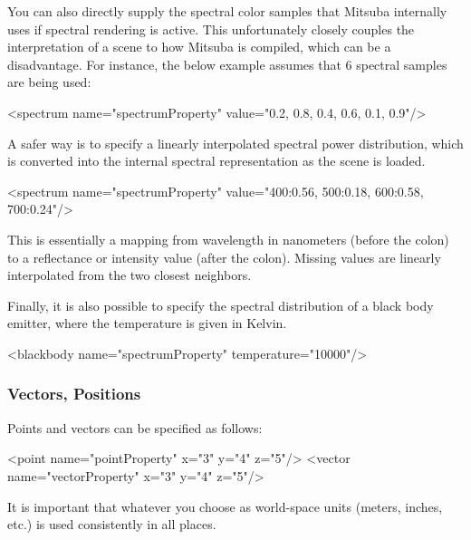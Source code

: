 You can also directly supply the spectral color samples that Mitsuba internally uses if spectral rendering is
active. This unfortunately closely couples the interpretation of a scene to how Mitsuba is compiled, which can be a disadvantage.
For instance, the below example assumes that 6 spectral samples are being used:
\begin{xml}
<spectrum name="spectrumProperty" value="0.2, 0.8, 0.4, 0.6, 0.1, 0.9"/>
\end{xml}
A safer way is to specify a linearly interpolated spectral power distribution, which is converted into
the internal spectral representation as the scene is loaded.
\begin{xml}
<spectrum name="spectrumProperty" value="400:0.56, 500:0.18, 600:0.58, 700:0.24"/>
\end{xml}
This is essentially a mapping from wavelength in nanometers (before the colon) to a reflectance or intensity value (after the colon). Missing values are linearly interpolated from the two closest neighbors.

Finally, it is also possible to specify the spectral distribution of a black body emitter, where the temperature is given in Kelvin.
\begin{xml}
<blackbody name="spectrumProperty" temperature="10000"/>
\end{xml}
\subsubsection{Vectors, Positions}
Points and vectors can be specified as follows:
\begin{xml}
<point name="pointProperty" x="3" y="4" z="5"/>
<vector name="vectorProperty" x="3" y="4" z="5"/>
\end{xml}
It is important that whatever you choose as world-space units (meters, inches, etc.) is 
used consistently in all places.
